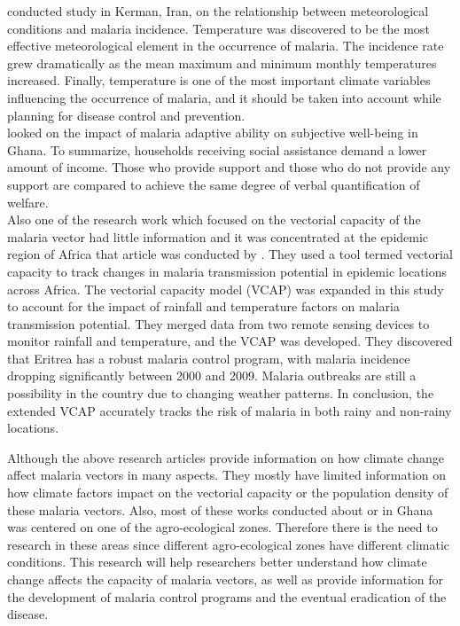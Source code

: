 \newpage
\noindent \cite{mohammadkhani2016relation} conducted study in Kerman, Iran, on the relationship between meteorological conditions and malaria incidence. Temperature was discovered to be the most effective meteorological element in the occurrence of malaria. The incidence rate grew dramatically as the mean maximum and minimum monthly temperatures increased. Finally, temperature is one of the most important climate variables influencing the occurrence of malaria, and it should be taken into account while planning for disease control and prevention.\\


\noindent \cite{christian2021effect} looked on the impact of malaria adaptive ability on subjective well-being in Ghana. To summarize, households receiving social assistance demand a lower amount of income. Those who provide support and those who do not provide any support are compared to achieve the same degree of verbal quantification of welfare.\\


\noindent Also one of the research work which focused on the vectorial capacity of the malaria vector had little information and it was concentrated at the epidemic region of Africa that article was conducted by \citep{ceccato2012vectorial}. They used a tool termed vectorial capacity to track changes in malaria transmission potential in epidemic locations across Africa. The vectorial capacity model (VCAP) was expanded in this study to account for the impact of rainfall and temperature factors on malaria transmission potential. They merged data from two remote sensing devices to monitor rainfall and temperature, and the VCAP was developed. They discovered that Eritrea has a robust malaria control program, with malaria incidence dropping significantly between 2000 and 2009. Malaria outbreaks are still a possibility in the country due to changing weather patterns. In conclusion, the extended VCAP accurately tracks the risk of malaria in both rainy and non-rainy locations.

\newpage
\noindent Although the above research articles provide information on how climate change affect malaria vectors in many aspects. They mostly have limited information on how climate factors impact on the vectorial capacity or the population density of these malaria vectors. Also, most of these works conducted about or in Ghana was centered on one of the agro-ecological zones. Therefore there is the need to research in these areas since different agro-ecological zones have different climatic conditions. This research will help researchers better understand how climate change affects the capacity of malaria vectors, as well as provide information for the development of malaria control programs and the eventual eradication of the disease.

